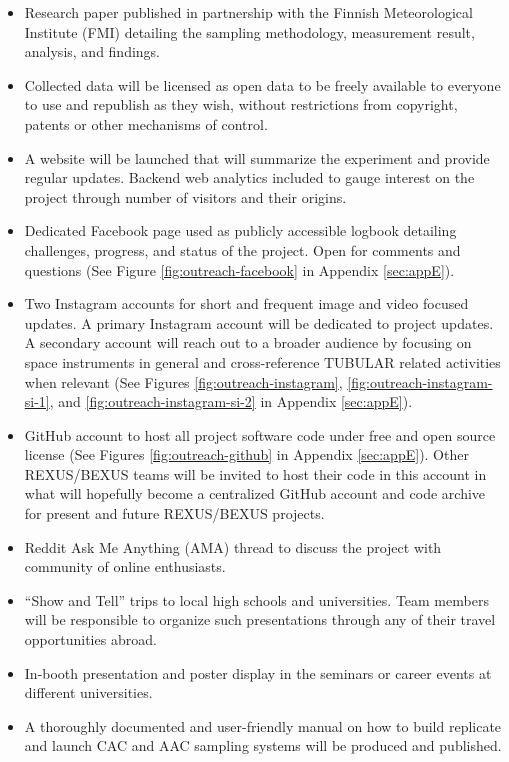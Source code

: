 \documentclass[a4paper,12pt,twoside]{article}
\begin{document}
\begin{itemize}
\item Research paper published in partnership with the Finnish Meteorological Institute (FMI) detailing the sampling methodology, measurement result, analysis, and findings.
\item Collected data will be licensed as open data to be freely available to everyone to use and republish as they wish, without restrictions from copyright, patents or other mechanisms of control.
\item A website will be launched that will summarize the experiment and provide regular updates. Backend web analytics included to gauge interest on the project through number of visitors and their origins.
\item Dedicated Facebook page used as publicly accessible logbook detailing challenges, progress, and status of the project. Open for comments and questions (See Figure \ref{fig:outreach-facebook} in Appendix \ref{sec:appE}).
\item Two Instagram accounts for short and frequent image and video focused updates. A primary Instagram account will be dedicated to project updates. A secondary account will reach out to a broader audience by focusing on space instruments in general and cross-reference TUBULAR related activities when relevant (See Figures \ref{fig:outreach-instagram}, \ref{fig:outreach-instagram-si-1}, and \ref{fig:outreach-instagram-si-2} in Appendix \ref{sec:appE}).
\item GitHub account to host all project software code under free and open source license (See Figures \ref{fig:outreach-github} in Appendix \ref{sec:appE}). Other REXUS/BEXUS teams will be invited to host their code in this account in what will hopefully become a centralized GitHub account and code archive for present and future REXUS/BEXUS projects.
\item Reddit Ask Me Anything (AMA) thread to discuss the project with community of online enthusiasts.
\item\enquote{Show and Tell} trips to local high schools and universities. Team members will be responsible to organize such presentations through any of their travel opportunities abroad.
\item In-booth presentation and poster display in the seminars or career events at different universities. 
\item A thoroughly documented and user-friendly manual on how to build replicate and launch CAC and AAC sampling systems will be produced and published.
\end{itemize}
\pagebreak
\end{document}
